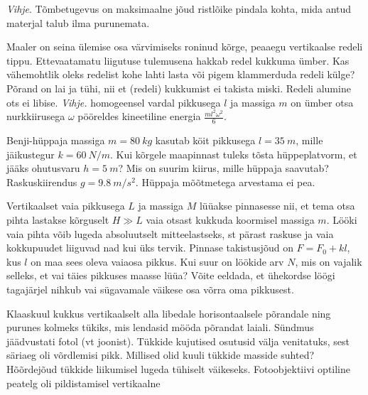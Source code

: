 \documentclass[10pt, twoside]{article}
\begin{document}
{\emph{Vihje}. Tõmbetugevus on maksimaalne jõud ristlõike pindala kohta, mida antud materjal talub ilma purunemata.
\probend
\bigskip


Maaler on seina ülemise osa värvimiseks roninud kõrge, peaaegu vertikaalse
redeli tippu. Ettevaatamatu liigutuse tulemusena hakkab redel kukkuma ümber. Kas
vähemohtlik oleks redelist kohe lahti lasta või pigem klammerduda redeli külge?
Põrand on lai ja tühi, nii et (redeli) kukkumist ei takista miski. Redeli alumine
ots ei libise.
\emph{Vihje.} homogeensel vardal pikkusega $l$ ja massiga $m$ on ümber otsa
nurkkiirusega $\omega$ pööreldes kineetiline energia $\frac{m l^2 \omega^2}{6}$.
\probend
\bigskip


Benji-hüppaja massiga $m=\SI{80}{kg}$ kasutab köit pikkusega $l=\SI{35}{m}$, mille jäikustegur $k=\SI{60}{N/m}$. Kui kõrgele maapinnast tuleks tõsta hüppeplatvorm, et jääks ohutusvaru $h=\SI{5}{m}$? Mis on suurim kiirus, mille hüppaja saavutab? Raskuskiirendus $g=\SI{9.8}{m/s^2}$. Hüppaja mõõtmetega arvestama ei pea.
\probend
\bigskip


Vertikaalset vaia pikkusega $L$ ja massiga $M$ lüüakse pinnasesse nii, et tema otsa pihta lastakse kõrguselt $H\gg L$ vaia otsast kukkuda koormisel massiga $m$. Lööki vaia pihta võib lugeda absoluutselt mitteelastseks, st pärast raskuse ja vaia kokkupuudet liiguvad nad kui üks tervik. Pinnase takistusjõud on $F = F_0 + kl$, kus $l$ on maa sees oleva vaiaosa pikkus. Kui suur on löökide arv $N$, mis on vajalik selleks, et vai täies pikkuses maasse lüüa? Võite eeldada, et ühekordse löögi tagajärjel nihkub vai sügavamale väikese osa võrra oma pikkusest.
\probend
\bigskip


Klaaskuul kukkus vertikaalselt alla libedale horisontaalsele põrandale ning purunes kolmeks tükiks, mis lendasid mööda põrandat laiali. Sündmus jäädvustati fotol (vt joonist). Tükkide kujutised osutusid välja venitatuks, sest säriaeg oli võrdlemisi pikk. Millised olid kuuli tükkide masside suhted? Hõõrdejõud tükkide liikumisel lugeda tühiselt väikeseks. Fotoobjektiivi optiline peatelg oli pildistamisel vertikaalne

}
\end{document}
